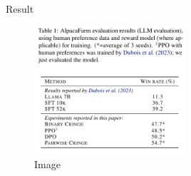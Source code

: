 \documentclass[10pt,xcolor={usenames,dvipsnames,table},aspectratio=169]{beamer}
\begin{document}
\begin{frame}{Result}
\begin{figure}
\centering    
\includegraphics[width=0.5\textwidth]{images/cr_loss.png}
\caption{Image}
\end{figure}
\end{frame}
\end{document}
